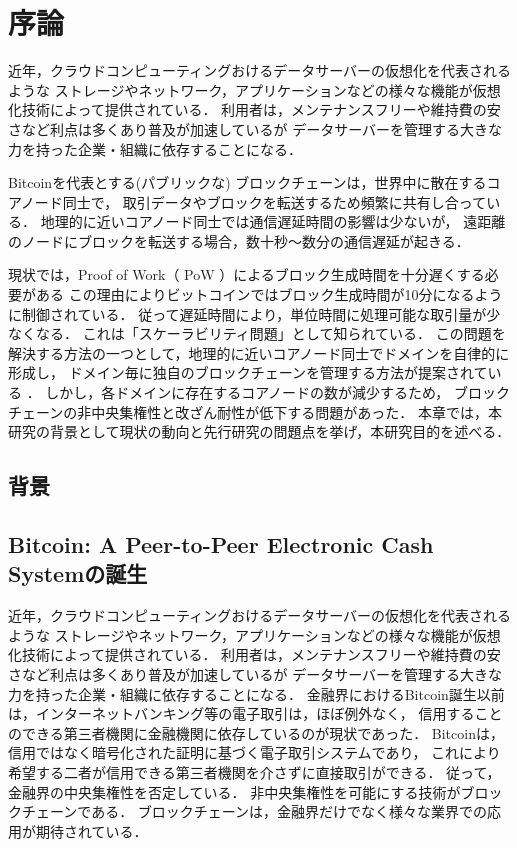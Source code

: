 \documentclass[a4paper,12pt]{jsarticle}
\begin{document}

\section{序論}
近年，クラウドコンピューティングおけるデータサーバーの仮想化を代表されるような
ストレージやネットワーク，アプリケーションなどの様々な機能が仮想化技術によって提供されている．
利用者は，メンテナンスフリーや維持費の安さなど利点は多くあり普及が加速しているが
データサーバーを管理する大きな力を持った企業・組織に依存することになる．

Bitcoinを代表とする(パブリックな) ブロックチェーンは，世界中に散在するコアノード同士で，
取引データやブロックを転送するため頻繁に共有し合っている．
地理的に近いコアノード同士では通信遅延時間の影響は少ないが，
遠距離のノードにブロックを転送する場合，数十秒〜数分の通信遅延が起きる．

現状では，Proof of Work（ PoW ）によるブロック生成時間を十分遅くする必要がある
この理由によりビットコインではブロック生成時間が10分になるように制御されている．
従って遅延時間により，単位時間に処理可能な取引量が少なくなる．
これは「スケーラビリティ問題」として知られている． 
この問題を解決する方法の一つとして，地理的に近いコアノード同士でドメインを自律的に形成し，
ドメイン毎に独自のブロックチェーンを管理する方法が提案されている \cite{fujihara1}\cite{fujihara2}．
しかし，各ドメインに存在するコアノードの数が減少するため，
ブロックチェーンの非中央集権性と改ざん耐性が低下する問題があった．
本章では，本研究の背景として現状の動向と先行研究の問題点を挙げ，本研究目的を述べる．


\subsection{背景}
\subsection*{Bitcoin: A Peer-to-Peer Electronic Cash Systemの誕生}
近年，クラウドコンピューティングおけるデータサーバーの仮想化を代表されるような
ストレージやネットワーク，アプリケーションなどの様々な機能が仮想化技術によって提供されている．
利用者は，メンテナンスフリーや維持費の安さなど利点は多くあり普及が加速しているが
データサーバーを管理する大きな力を持った企業・組織に依存することになる．
金融界におけるBitcoin誕生以前は，インターネットバンキング等の電子取引は，ほぼ例外なく，
信用することのできる第三者機関に金融機関に依存しているのが現状であった．
Bitcoinは，信用ではなく暗号化された証明に基づく電子取引システムであり，
これにより希望する二者が信用できる第三者機関を介さずに直接取引ができる．
従って，金融界の中央集権性を否定している．
非中央集権性を可能にする技術がブロックチェーンである．
ブロックチェーンは，金融界だけでなく様々な業界での応用が期待されている．
\end{document}
